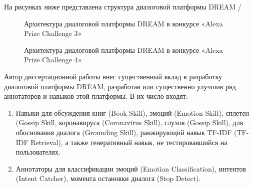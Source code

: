На рисунках ниже представлена структура диалоговой платформы DREAM /

\begin{figure}[ht]
  \caption{Архитектура диалоговой платформы {DREAM} в конкурсе «Alexa Prize Challenge 3»}\label{fig:Alexa1}
\end{figure}

\begin{figure}[ht]
  \caption{Архитектура диалоговой платформы {DREAM} в конкурсе «Alexa Prize Challenge 4»}\label{fig:Alexa2}
\end{figure}

Автор диссертационной работы внес существенный вклад в разработку диалоговой платформы DREAM, разработав или существенно улучшив ряд аннотаторов и навыков этой платформы. В их число входят:
\begin{enumerate}
 \item Навыки для обсуждения книг (Book Skill), эмоций (Emotion Skill), сплетен (Gossip Skill, коронавируса (Coronavirus Skill), слухов (Gossip Skill), для обоснования диалога (Grounding Skill), ранжирующий навык TF-IDF (TF-IDF Retrieval), а также генеративный навык, не тестировавшийся на пользователях.
 \item Аннотаторы для классификации эмоций (Emotion Classification), интентов (Intent Catcher), момента остановки диалога (Stop Detect).
\end{enumerate}

